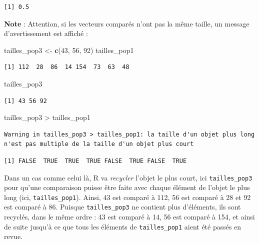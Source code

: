 \documentclass[a4paperpaper,]{article}
\newenvironment{Shaded}{\begin{snugshade}}{\end{snugshade}}
\newcommand{\DecValTok}[1]{\textcolor[rgb]{0.69,0.50,0.00}{#1}}
\newcommand{\KeywordTok}[1]{\textcolor[rgb]{0.12,0.11,0.11}{\textbf{#1}}}
\newcommand{\NormalTok}[1]{\textcolor[rgb]{0.12,0.11,0.11}{#1}}
\newcommand{\OperatorTok}[1]{\textcolor[rgb]{0.12,0.11,0.11}{#1}}
\newcommand{\StringTok}[1]{\textcolor[rgb]{0.75,0.01,0.01}{#1}}
\begin{document}
\begin{verbatim}
[1] 0.5
\end{verbatim}

\textbf{Note} : Attention, si les vecteurs comparés n'ont pas la même taille, un message d'avertissement est affiché :

\begin{Shaded}
\begin{Highlighting}[]
\NormalTok{tailles_pop3 <-}\StringTok{ }\KeywordTok{c}\NormalTok{(}\DecValTok{43}\NormalTok{, }\DecValTok{56}\NormalTok{, }\DecValTok{92}\NormalTok{)}
\NormalTok{tailles_pop1}
\end{Highlighting}
\end{Shaded}

\begin{verbatim}
[1] 112  28  86  14 154  73  63  48
\end{verbatim}

\begin{Shaded}
\begin{Highlighting}[]
\NormalTok{tailles_pop3}
\end{Highlighting}
\end{Shaded}

\begin{verbatim}
[1] 43 56 92
\end{verbatim}

\begin{Shaded}
\begin{Highlighting}[]
\NormalTok{tailles_pop3 }\OperatorTok{>}\StringTok{ }\NormalTok{tailles_pop1}
\end{Highlighting}
\end{Shaded}

\begin{verbatim}
Warning in tailles_pop3 > tailles_pop1: la taille d'un objet plus long
n'est pas multiple de la taille d'un objet plus court
\end{verbatim}

\begin{verbatim}
[1] FALSE  TRUE  TRUE  TRUE FALSE  TRUE FALSE  TRUE
\end{verbatim}

Dans un cas comme celui là, R va \emph{recycler} l'objet le plus court, ici \texttt{tailles\_pop3} pour qu'une comparaison puisse être faite avec chaque élément de l'objet le plus long (ici, \texttt{tailles\_pop1}). Ainsi, 43 est comparé à 112, 56 est comparé à 28 et 92 est comparé à 86. Puisque \texttt{tailles\_pop3} ne contient plus d'éléments, ils sont recyclés, dans le même ordre : 43 est comparé à 14, 56 est comparé à 154, et ainsi de suite jusqu'à ce que tous les éléments de \texttt{tailles\_pop1} aient été passés en revue.
\end{document}
